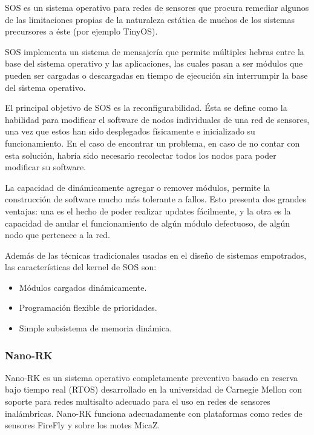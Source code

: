 SOS es un sistema operativo para redes de sensores que procura remediar algunos de las limitaciones propias de la naturaleza estática de muchos de los sistemas precursores a éste (por ejemplo TinyOS).



SOS implementa un sistema de mensajería que permite múltiples hebras entre la base del sistema operativo y las aplicaciones, las cuales pasan a ser módulos que pueden ser cargadas o descargadas en tiempo de ejecución sin interrumpir la base del sistema operativo.



El principal objetivo de SOS es la reconfigurabilidad. Ésta se define como la habilidad para modificar el software de nodos individuales de una red de sensores, una vez que estos han sido desplegados físicamente e inicializado su funcionamiento. En el caso de encontrar un problema, en caso de no contar con esta solución, habría sido necesario recolectar todos los nodos para poder modificar su software.



La capacidad de dinámicamente agregar o remover módulos, permite la construcción de software mucho más tolerante a fallos. Esto presenta dos grandes ventajas: una es el hecho de poder realizar updates fácilmente, y la otra es la capacidad de anular el funcionamiento de algún módulo defectuoso, de algún nodo que pertenece a la red.



Además de las técnicas tradicionales usadas en el diseño de sistemas empotrados, las características del kernel de SOS son:
\begin{itemize}
\item Módulos cargados dinámicamente.
\item Programación flexible de prioridades.
\item Simple subsistema de memoria dinámica.
\end{itemize}






\subsubsection{Nano-RK}
Nano-RK es un sistema operativo completamente preventivo basado en reserva bajo tiempo real (RTOS) desarrollado en la universidad de Carnegie Mellon con soporte para redes multisalto adecuado para el uso en redes de sensores inalámbricas. Nano-RK funciona adecuadamente con plataformas como redes de sensores FireFly y sobre los motes MicaZ.




